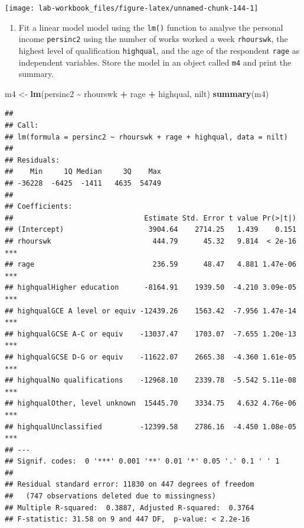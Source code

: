 \documentclass[
]{book}
\newenvironment{Shaded}{\begin{snugshade}}{\end{snugshade}}
\newcommand{\FunctionTok}[1]{\textcolor[rgb]{0.13,0.29,0.53}{\textbf{#1}}}
\newcommand{\NormalTok}[1]{#1}
\newcommand{\OtherTok}[1]{\textcolor[rgb]{0.56,0.35,0.01}{#1}}
\newcommand{\SpecialCharTok}[1]{\textcolor[rgb]{0.81,0.36,0.00}{\textbf{#1}}}
\providecommand{\tightlist}{%
  \setlength{\itemsep}{0pt}\setlength{\parskip}{0pt}}
\begin{document}
\begin{flushleft}\texttt{[image: lab-workbook\_files/figure-latex/unnamed-chunk-144-1]} \end{flushleft}

\begin{enumerate}
\def\labelenumi{\arabic{enumi}.}
\setcounter{enumi}{3}
\tightlist
\item
  Fit a linear model model using the \texttt{lm()} function to analyse the personal income \texttt{persinc2} using the number of works worked a week \texttt{rhourswk}, the highest level of qualification \texttt{highqual}, and the age of the respondent \texttt{rage} as independent variables. Store the model in an object called \texttt{m4} and print the summary.
\end{enumerate}

\begin{Shaded}
\begin{Highlighting}[]
\NormalTok{m4 }\OtherTok{\textless{}{-}} \FunctionTok{lm}\NormalTok{(persinc2 }\SpecialCharTok{\textasciitilde{}}\NormalTok{ rhourswk }\SpecialCharTok{+}\NormalTok{ rage }\SpecialCharTok{+}\NormalTok{ highqual, nilt)}
\FunctionTok{summary}\NormalTok{(m4)}
\end{Highlighting}
\end{Shaded}

\begin{verbatim}
## 
## Call:
## lm(formula = persinc2 ~ rhourswk + rage + highqual, data = nilt)
## 
## Residuals:
##    Min     1Q Median     3Q    Max 
## -36228  -6425  -1411   4635  54749 
## 
## Coefficients:
##                               Estimate Std. Error t value Pr(>|t|)    
## (Intercept)                    3904.64    2714.25   1.439    0.151    
## rhourswk                        444.79      45.32   9.814  < 2e-16 ***
## rage                            236.59      48.47   4.881 1.47e-06 ***
## highqualHigher education      -8164.91    1939.50  -4.210 3.09e-05 ***
## highqualGCE A level or equiv -12439.26    1563.42  -7.956 1.47e-14 ***
## highqualGCSE A-C or equiv    -13037.47    1703.07  -7.655 1.20e-13 ***
## highqualGCSE D-G or equiv    -11622.07    2665.38  -4.360 1.61e-05 ***
## highqualNo qualifications    -12968.10    2339.78  -5.542 5.11e-08 ***
## highqualOther, level unknown  15445.70    3334.75   4.632 4.76e-06 ***
## highqualUnclassified         -12399.58    2786.16  -4.450 1.08e-05 ***
## ---
## Signif. codes:  0 '***' 0.001 '**' 0.01 '*' 0.05 '.' 0.1 ' ' 1
## 
## Residual standard error: 11830 on 447 degrees of freedom
##   (747 observations deleted due to missingness)
## Multiple R-squared:  0.3887, Adjusted R-squared:  0.3764 
## F-statistic: 31.58 on 9 and 447 DF,  p-value: < 2.2e-16
\end{verbatim}
\end{document}
